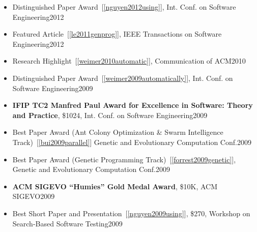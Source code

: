\documentclass[11pt]{article}
\begin{document}
\begin{itemize}
      \item Distinguished Paper Award~[\ref{nguyen2012using}], Int. Conf. on Software Engineering\hfill 2012

      \item Featured Article~[\ref{le2011genprog}], IEEE Transactions on Software Engineering\hfill 2012

      \item Research Highlight~[\ref{weimer2010automatic}], Communication of ACM\hfill 2010

      \item Distinguished Paper Award~[\ref{weimer2009automatically}], Int. Conf. on Software Engineering\hfill 2009

      \item \textbf{IFIP TC2 Manfred Paul Award for Excellence in Software: Theory and Practice}, \$1024, Int. Conf. on Software Engineering\hfill 2009


      \item Best Paper Award (Ant Colony Optimization \& Swarm Intelligence Track)~[\ref{bui2009parallel}] Genetic and Evolutionary Computation Conf.\hfill 2009
      \item Best Paper Award (Genetic Programming Track)~[\ref{forrest2009genetic}], Genetic and Evolutionary Computation Conf.\hfill 2009
      \item \textbf{ACM SIGEVO “Humies” Gold Medal Award}, \$10K, ACM SIGEVO\hfill 2009
      \item Best Short Paper and Presentation~[\ref{nguyen2009using}], \$270, Workshop on Search-Based Software Testing\hfill 2009



\end{itemize}
\end{document}
